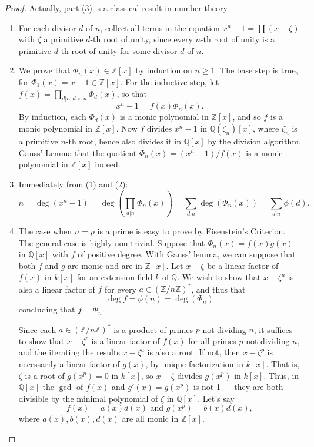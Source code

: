 \documentclass[12pt]{report}
\theoremstyle{definition}
\def\ZZ{\mathbb{Z}}
\def\QQ{\mathbb{Q}}
\begin{document}
\begin{proof}
    Actually, part (3) is a classical result in number theory.
    \begin{enumerate}
        \item For each divisor $d$ of $n$, collect all terms in the equation $x^n- 1 = \prod(x- \zeta)$ with $\zeta$ a primitive $d$-th root of unity, since every $n$-th root of unity is a primitive $d$-th root of unity for some divisor $d$ of $n$.
        \item We prove that $\Phi_n(x) \in  \ZZ[x]$ by induction on $n \geq  1$. The base step is true, for $\Phi_1(x) = x- 1 \in  \ZZ[x]$. For the inductive step, let $f(x) =\prod_{d|n,d<n} \Phi_d(x)$, so that $$x^n - 1 = f(x)\Phi_n(x).$$
        By induction, each $\Phi_d(x)$ is a monic polynomial in $\ZZ[x]$, and so $f$ is a monic polynomial in $\ZZ[x]$. Now $f$ divides $x^n-1$ in $\QQ(\zeta_n)[x]$, where $\zeta_n$ is a primitive $n$-th root, hence also divides it in $\QQ[x]$ by the division algorithm. Gauss' Lemma that the quotient $\Phi_n(x)=(x^n- 1)/f(x)$ is a monic polynomial in $\ZZ[x]$ indeed. 
        \item Immediately from (1) and (2):
        $$n=\deg(x^n-1)=\deg(\prod_{d|n}\Phi_n(x))=\sum_{d|n}\deg(\Phi_n(x))=\sum_{d|n} \phi(d).$$
        \item The case when $n=p$ is a prime is easy to prove by Eisenstein's Criterion. The general case is highly non-trivial.
        Suppose that $\Phi_n(x) = f(x)g(x)$ in $\QQ[x]$ with $f$ of positive degree. With Gauss' lemma, we can suppose that both $f$ and $g$ are monic and are in $\ZZ[x]$. Let $x - \zeta$ be a linear factor of $f(x)$ in $k[x]$ for an extension field $k$ of $\QQ$. We wish to show that $x - \zeta^a$ is also a linear factor of $f$ for every $a \in (\ZZ/n\ZZ)^*$, and thus that $$ \deg f = \phi(n) = \deg (\Phi_n)$$ concluding that $f = \Phi_n$.

        Since each $a \in (\ZZ/n\ZZ)^*$ is a product of primes $p$ not dividing $n$, it suffices to show that $x - \zeta^p$ is a linear factor of $f(x)$ for all primes $p$ not dividing $n$, and the iterating the results $x-\zeta^a$ is also a root. If not, then $x - \zeta^p$ is necessarily a linear factor of $g(x)$, by unique factorization in $k[x]$. That is, $\zeta$ is a root of $g(x^p) = 0$ in $k[x]$, so $x - \zeta$ divides $g(x^p)$ in $k[x]$.
        Thus, in $\QQ[x]$ the $\gcd$ of $f(x)$ and $g'(x)=g(x^p)$ is not 1 --- they are both divisible by the minimal polynomial of $\zeta$ in $\QQ[x]$. Let's say 
        $$f(x)=a(x)d(x) \mbox{ and } g(x^p)=b(x)d(x),$$ where $a(x),b(x),d(x)$ are all monic in $\ZZ[x]$. 


\end{enumerate}
\end{proof}
\end{document}
